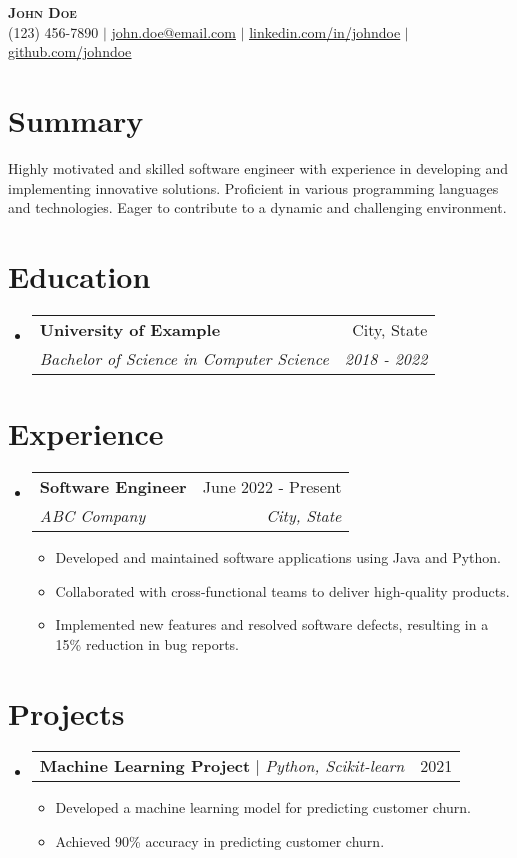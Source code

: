 \documentclass[letterpaper,11pt]{article}
\makeatletter
\newcommand{\resumeItem}[1]{
\item\small{
{#1 \vspace{-2pt}}
}
}
\newcommand{\resumeSubheading}[4]{
\vspace{-2pt}\item
\begin{tabular*}{0.97\textwidth}[t]{l@{\extracolsep{\fill}}r}
\textbf{#1} & #2 \\
\textit{\small#3} & \textit{\small #4} \\
\end{tabular*}\vspace{-7pt}
}
\newcommand{\resumeProjectHeading}[2]{
\item
\begin{tabular*}{0.97\textwidth}{l@{\extracolsep{\fill}}r}
\small#1 & #2 \\
\end{tabular*}\vspace{-7pt}
}
\newcommand{\resumeSubHeadingListStart}{\begin{itemize}[leftmargin=0.15in, label={}]}
\newcommand{\resumeSubHeadingListEnd}{\end{itemize}}
\newcommand{\resumeItemListStart}{\begin{itemize}}
\newcommand{\resumeItemListEnd}{\end{itemize}\vspace{-5pt}}
\makeatother
\begin{document}
\begin{center}
\textbf{\Huge \scshape John Doe} \\ \vspace{1pt}
\small (123) 456-7890 $|$ \href{mailto:john.doe@email.com}{\underline{john.doe@email.com}} $|$
\href{https://linkedin.com/in/johndoe}{\underline{linkedin.com/in/johndoe}} $|$
\href{https://github.com/johndoe}{\underline{github.com/johndoe}}
\end{center}


\section{Summary}
Highly motivated and skilled software engineer with experience in developing and implementing innovative solutions. Proficient in various programming languages and technologies. Eager to contribute to a dynamic and challenging environment.

\section{Education}
\resumeSubHeadingListStart
\resumeSubheading{University of Example}{City, State}{Bachelor of Science in Computer Science}{2018 - 2022}
\resumeSubHeadingListEnd

\section{Experience}
\resumeSubHeadingListStart
\resumeSubheading{Software Engineer}{June 2022 - Present}{ABC Company}{City, State}
\resumeItemListStart
\resumeItem{Developed and maintained software applications using Java and Python.}
\resumeItem{Collaborated with cross-functional teams to deliver high-quality products.}
\resumeItem{Implemented new features and resolved software defects, resulting in a 15\% reduction in bug reports.}
\resumeItemListEnd
\resumeSubHeadingListEnd

\section{Projects}
\resumeSubHeadingListStart
\resumeProjectHeading{\textbf{Machine Learning Project} $|$ \emph{Python, Scikit-learn}}{2021}
\resumeItemListStart
\resumeItem{Developed a machine learning model for predicting customer churn.}
\resumeItem{Achieved 90\% accuracy in predicting customer churn.}
\resumeItemListEnd
\resumeSubHeadingListEnd
\end{document}
